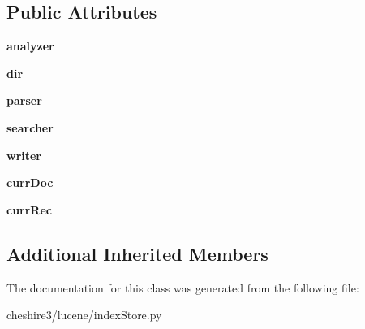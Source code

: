 \subsection*{Public Attributes}
\begin{DoxyCompactItemize}
\item 
\hypertarget{classcheshire3_1_1lucene_1_1index_store_1_1_lucene_index_store_a44b1f98aa95c2a4b95810c88143ed002}{{\bfseries analyzer}}\label{classcheshire3_1_1lucene_1_1index_store_1_1_lucene_index_store_a44b1f98aa95c2a4b95810c88143ed002}

\item 
\hypertarget{classcheshire3_1_1lucene_1_1index_store_1_1_lucene_index_store_a6affd577b66c8fb04aa803c8532a3eec}{{\bfseries dir}}\label{classcheshire3_1_1lucene_1_1index_store_1_1_lucene_index_store_a6affd577b66c8fb04aa803c8532a3eec}

\item 
\hypertarget{classcheshire3_1_1lucene_1_1index_store_1_1_lucene_index_store_afc87319676393e03b312d203e65d2749}{{\bfseries parser}}\label{classcheshire3_1_1lucene_1_1index_store_1_1_lucene_index_store_afc87319676393e03b312d203e65d2749}

\item 
\hypertarget{classcheshire3_1_1lucene_1_1index_store_1_1_lucene_index_store_a7b76d09d0cce771103c64a8df93b9015}{{\bfseries searcher}}\label{classcheshire3_1_1lucene_1_1index_store_1_1_lucene_index_store_a7b76d09d0cce771103c64a8df93b9015}

\item 
\hypertarget{classcheshire3_1_1lucene_1_1index_store_1_1_lucene_index_store_af0c0bdef8de5bb907a9cf6db3d0b6ec4}{{\bfseries writer}}\label{classcheshire3_1_1lucene_1_1index_store_1_1_lucene_index_store_af0c0bdef8de5bb907a9cf6db3d0b6ec4}

\item 
\hypertarget{classcheshire3_1_1lucene_1_1index_store_1_1_lucene_index_store_a57f5a7430417701faa77ec4484be4791}{{\bfseries curr\-Doc}}\label{classcheshire3_1_1lucene_1_1index_store_1_1_lucene_index_store_a57f5a7430417701faa77ec4484be4791}

\item 
\hypertarget{classcheshire3_1_1lucene_1_1index_store_1_1_lucene_index_store_a421467b8585a467043c1a00e77a411d9}{{\bfseries curr\-Rec}}\label{classcheshire3_1_1lucene_1_1index_store_1_1_lucene_index_store_a421467b8585a467043c1a00e77a411d9}

\end{DoxyCompactItemize}
\subsection*{Additional Inherited Members}


The documentation for this class was generated from the following file\-:\begin{DoxyCompactItemize}
\item 
cheshire3/lucene/index\-Store.\-py\end{DoxyCompactItemize}
